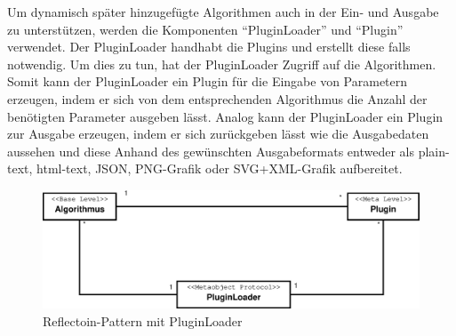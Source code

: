 Um dynamisch später hinzugefügte Algorithmen auch in der Ein- und Ausgabe zu unterstützen, werden die Komponenten "`PluginLoader"' und "`Plugin"' verwendet. Der PluginLoader handhabt die Plugins und erstellt diese falls notwendig. Um dies zu tun, hat der PluginLoader Zugriff auf die Algorithmen. Somit kann der PluginLoader ein Plugin für die Eingabe von Parametern erzeugen, indem er sich von dem entsprechenden Algorithmus die Anzahl der benötigten Parameter ausgeben lässt. Analog kann der PluginLoader ein Plugin zur Ausgabe erzeugen, indem er sich zurückgeben lässt wie die Ausgabedaten aussehen und diese Anhand des gewünschten Ausgabeformats entweder als plain-text, html-text, JSON, PNG-Grafik oder SVG+XML-Grafik aufbereitet.
\begin{figure}[h]
\centering
	\vspace{-5pt}
\includegraphics[width=0.7\linewidth]{Grafik/Diagramm/Reflection}
\caption[Reflection-Klasse]{Reflectoin-Pattern mit PluginLoader}
\label{fig:Reflection}
\end{figure}
\pagebreak

